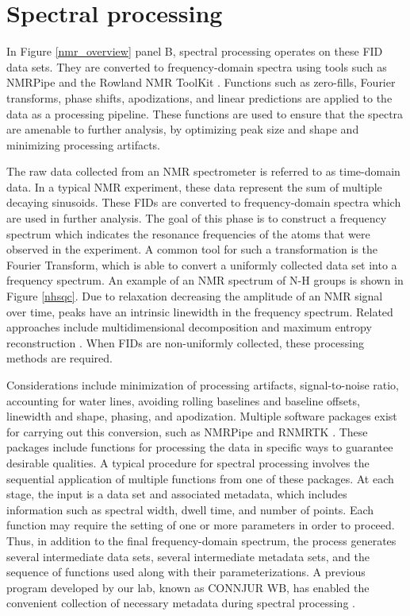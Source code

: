 \section{Spectral processing}

In Figure \ref{nmr_overview} panel B, 
spectral processing operates on these FID data sets.  They are 
converted to frequency-domain spectra using tools such as NMRPipe \cite{nmrpipe}
and the Rowland NMR ToolKit \cite{rnmrtk}.  Functions such as 
zero-fills, Fourier transforms, phase shifts, apodizations, and linear 
predictions are applied to the data as a processing pipeline.  These 
functions are used to ensure that the spectra are amenable to further 
analysis, by optimizing peak size and shape and minimizing processing 
artifacts.

The raw data collected from an NMR spectrometer is referred to as 
time-domain data.  In a typical NMR experiment, these data represent the 
sum of multiple decaying sinusoids.  These FIDs are converted to 
frequency-domain spectra which are used in further analysis.  The goal of 
this phase is to construct a frequency spectrum which indicates the resonance 
frequencies of the atoms that were observed in the experiment.  A common tool 
for such a transformation is the Fourier Transform, which is able to convert 
a uniformly collected data set into a frequency spectrum.  
An example of an NMR spectrum of N-H groups is shown in Figure \ref{nhsqc}.
Due to relaxation decreasing the amplitude of an NMR signal over time, peaks 
have an intrinsic linewidth in the frequency spectrum.
Related approaches include multidimensional decomposition \cite{mdd}
and maximum entropy reconstruction \cite{hoch1996nmr}.  When FIDs are 
non-uniformly collected, these processing methods are required.

Considerations include minimization of processing artifacts, signal-to-noise 
ratio, accounting for water lines, avoiding rolling baselines and baseline 
offsets, linewidth and shape, phasing, and apodization.  Multiple software 
packages exist for carrying out this conversion, such as NMRPipe and RNMRTK \cite{nmrpipe, rnmrtk}.
These packages include functions for processing the data in specific ways to 
guarantee desirable qualities.  A typical procedure for spectral processing 
involves the sequential application of multiple functions from one of these 
packages.  At each stage, the input is a data set and associated metadata, 
which includes information such as spectral width, dwell time, and number of 
points.  Each function may require the setting of one or more parameters in 
order to proceed.  Thus, in addition to the final frequency-domain spectrum, 
the process generates several intermediate data sets, several 
intermediate metadata sets, and the sequence of functions used along with 
their parameterizations.  A previous program developed by our lab, known
as CONNJUR WB, has enabled the convenient collection of necessary metadata 
during spectral processing \cite{connjur-wb}.



